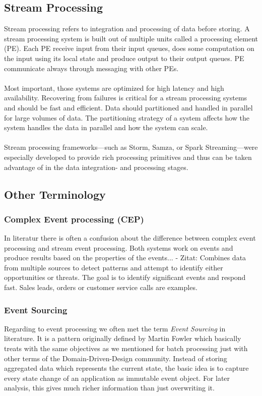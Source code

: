 \subsection{Stream Processing}
\label{intro-datastream-streamprocessing}
Stream processing refers to integration and processing of data before storing. 
A stream processing system is built out of multiple units called a processing
element (PE). Each PE receive input from their input queues, does some
computation on the input using its local state and produce output to their
output queues. PE communicate always through messaging with other PEs. 
\\ \\
Most important, those systems are optimized for high latency and high
availability. Recovering from failures is critical for a stream processing
systems and should be fast and efficient. 
Data should partitioned and handled in parallel for large volumes of data. 
The partitioning strategy of a system  affects how the system
handles the data in parallel and how the system can scale. 
\cite{PrpSvyOfDSPS}
\\ \\
Stream processing frameworks---such as Storm, Samza, or Spark
Streaming---were especially developed to provide rich processing primitives and
thus can be taken advantage of in the data integration- and processing stages.

\subsection{Other Terminology}
\subsubsection{Complex Event processing (CEP)}
In literatur there is often a confusion about the difference between
complex event processing and stream event processing. Both systems work on
events and produce results based on the properties of the events... 
- Zitat: Combines data from multiple sources  to detect patterns and attempt to
identify either opportunities or threats. The goal is to identify significant
events and respond fast. Sales leads, orders or customer service calls are
examples.\\


\subsubsection{Event Sourcing}
\label{event-sourcing}
Regarding to event processing we often met the term \textit{Event Sourcing} in
literature. It is a pattern originally defined by Martin Fowler which basically
treats with the same objectives as we mentioned for batch processing just with
other terms of the Domain-Driven-Design community. Instead of storing aggregated
data which represents the current state, the basic idea is to capture
every state change of an application as immutable event object. For later
analysis, this gives much richer information than just overwriting it. 

